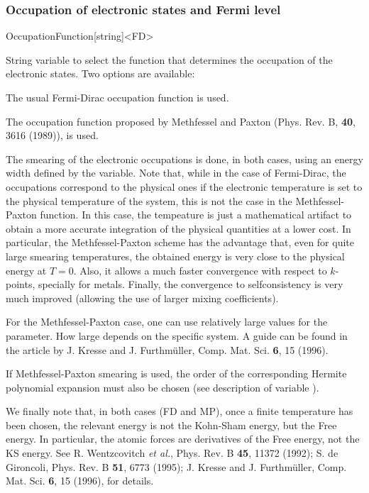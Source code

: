 \subsubsection{Occupation of electronic states and Fermi level}
\label{electronic-occupation}


\begin{fdfentry}{OccupationFunction}[string]<FD>
  
  String variable to select the function that determines the
  occupation of the electronic states. Two options are available:
  \begin{fdfoptions}
    \option[FD]%
    The usual Fermi-Dirac occupation function is used.

    \option[MP]%
    The occupation function proposed by Methfessel and
    Paxton (Phys. Rev. B, \textbf{40}, 3616 (1989)), is used.

  \end{fdfoptions}
  The smearing of the electronic occupations is done, in both cases,
  using an energy width defined by the 
  variable. Note that, while in the case of Fermi-Dirac, the
  occupations correspond to the physical ones if the electronic
  temperature is set to the physical temperature of the system, this
  is not the case in the Methfessel-Paxton function. In this case, the
  tempeature is just a mathematical artifact to obtain a more accurate
  integration of the physical quantities at a lower cost. In
  particular, the Methfessel-Paxton scheme has the advantage that,
  even for quite large smearing temperatures, the obtained energy is
  very close to the physical energy at $T=0$.  Also, it allows a much
  faster convergence with respect to $k$-points, specially for
  metals. Finally, the convergence to selfconsistency is very much
  improved (allowing the use of larger mixing coefficients).

  For the Methfessel-Paxton case, one can use relatively large values
  for the  parameter. How large depends
  on the specific system. A guide can be found in the article by
  J. Kresse and J. Furthm\"uller, Comp. Mat. Sci.  \textbf{6}, 15
  (1996).

  If Methfessel-Paxton smearing is used, the order of the
  corresponding Hermite polynomial expansion must also be chosen (see
  description of variable ).

  We finally note that, in both cases (FD and MP), once a finite
  temperature has been chosen, the relevant energy is not the
  Kohn-Sham energy, but the Free energy. In particular, the atomic
  forces are derivatives of the Free energy, not the KS energy. See
  R. Wentzcovitch \textit{et al.}, Phys. Rev. B \textbf{45}, 11372
  (1992); S. de Gironcoli, Phys. Rev. B \textbf{51}, 6773 (1995);
  J. Kresse and J. Furthm\"uller, Comp. Mat. Sci.  \textbf{6}, 15
  (1996), for details.

\end{fdfentry}


